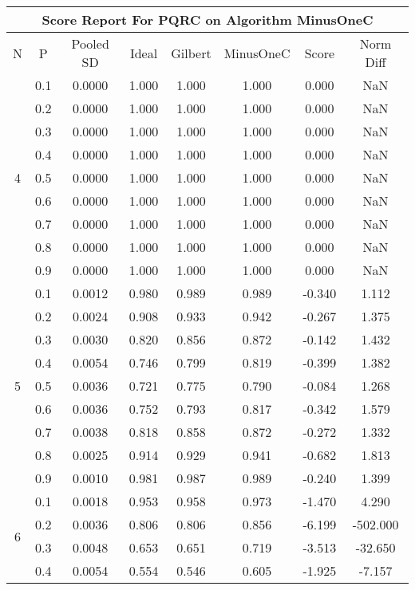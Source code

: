 \documentclass[11pt,a4paper]{report}
\begin{document}
\begin{longtable}{ | c | c || c | c | c | c | c | c | }
\hline
\multicolumn{8}{|c|}{ Score Report For PQRC on Algorithm MinusOneC} \\
\hline
N & P & Pooled SD &  Ideal &  Gilbert & MinusOneC  & Score & Norm Diff \\
 \hline
 \hline
 \endhead
\multirow{9}{*}{4} & 0.1 & 0.0000 & 1.000 & 1.000 & 1.000 & 0.000 & NaN \\
 & 0.2 & 0.0000 & 1.000 & 1.000 & 1.000 & 0.000 & NaN \\
 & 0.3 & 0.0000 & 1.000 & 1.000 & 1.000 & 0.000 & NaN \\
 & 0.4 & 0.0000 & 1.000 & 1.000 & 1.000 & 0.000 & NaN \\
 & 0.5 & 0.0000 & 1.000 & 1.000 & 1.000 & 0.000 & NaN \\
 & 0.6 & 0.0000 & 1.000 & 1.000 & 1.000 & 0.000 & NaN \\
 & 0.7 & 0.0000 & 1.000 & 1.000 & 1.000 & 0.000 & NaN \\
 & 0.8 & 0.0000 & 1.000 & 1.000 & 1.000 & 0.000 & NaN \\
 & 0.9 & 0.0000 & 1.000 & 1.000 & 1.000 & 0.000 & NaN \\
 \hline
\multirow{9}{*}{5} & 0.1 & 0.0012 & 0.980 & 0.989 & 0.989 & -0.340 & 1.112 \\
 & 0.2 & 0.0024 & 0.908 & 0.933 & 0.942 & -0.267 & 1.375 \\
 & 0.3 & 0.0030 & 0.820 & 0.856 & 0.872 & -0.142 & 1.432 \\
 & 0.4 & 0.0054 & 0.746 & 0.799 & 0.819 & -0.399 & 1.382 \\
 & 0.5 & 0.0036 & 0.721 & 0.775 & 0.790 & -0.084 & 1.268 \\
 & 0.6 & 0.0036 & 0.752 & 0.793 & 0.817 & -0.342 & 1.579 \\
 & 0.7 & 0.0038 & 0.818 & 0.858 & 0.872 & -0.272 & 1.332 \\
 & 0.8 & 0.0025 & 0.914 & 0.929 & 0.941 & -0.682 & 1.813 \\
 & 0.9 & 0.0010 & 0.981 & 0.987 & 0.989 & -0.240 & 1.399 \\
 \hline
\multirow{9}{*}{6} & 0.1 & 0.0018 & 0.953 & 0.958 & 0.973 & -1.470 & 4.290 \\
 & 0.2 & 0.0036 & 0.806 & 0.806 & 0.856 & -6.199 & -502.000 \\
 & 0.3 & 0.0048 & 0.653 & 0.651 & 0.719 & -3.513 & -32.650 \\
 & 0.4 & 0.0054 & 0.554 & 0.546 & 0.605 & -1.925 & -7.157 \\

\end{longtable}
\end{document}
